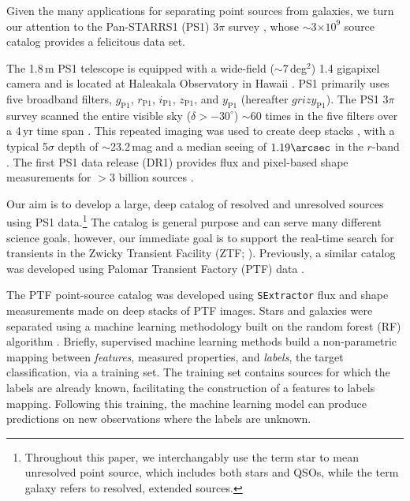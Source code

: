 \documentclass[twocolumn, dvipdfmx]{aastex62}
\begin{document}
\begin{CJK*}{UTF8}{gbsn}
Given the many applications for separating point sources from
galaxies, we turn our attention to the Pan-STARRS1 (PS1) 3$\pi$ survey
\citep{Chambers16}, whose $\sim$3$\times 10^{9}$ source catalog provides a
felicitous data set.

The 1.8\,m PS1 telescope is equipped with a wide-field ($\sim$7\,deg$^2$)
1.4 gigapixel camera and is located at Haleakala Observatory in Hawaii
\citep{Hodapp04}. PS1 primarily uses five broadband filters,
$g_{\mathrm{P1}}$, $r_{\mathrm{P1}}$, $i_{\mathrm{P1}}$, $z_{\mathrm{P1}}$,
and $y_{\mathrm{P1}}$ (hereafter $grizy_{\mathrm{P1}}$). The PS1 3$\pi$
survey scanned the entire visible sky ($\delta > -30^\circ$) $\sim$60 times
in the five filters over a 4\,yr time span \citep{Chambers16}. This
repeated imaging was used to create deep stacks \citep{Magnier16a}, with a
typical 5$\sigma$ depth of $\sim$23.2\,mag and a median seeing of
$1.19\arcsec$ in the $r$-band \citep{Tonry12, Schlafly12, Chambers16}. The
first PS1 data release (DR1) provides flux and pixel-based shape
measurements for $>$3 billion sources \citep{Flewelling16}.

Our aim is to develop a large, deep catalog of resolved and unresolved
sources using PS1 data.\footnote{Throughout this paper, we interchangably
use the term star to mean unresolved point source, which includes both stars
and QSOs, while the term galaxy refers to resolved, extended sources.} The
catalog is general purpose and can serve many different science goals,
however, our immediate goal is to support the real-time search for
transients in the Zwicky Transient Facility (ZTF; \citealt{Bellm:18:ZTF}).
Previously, a similar catalog was developed using Palomar Transient Factory
(PTF) data \citep{Miller17}.

The PTF point-source catalog was developed using \texttt{SExtractor}
\citep{bertin96} flux and shape measurements made on deep stacks of PTF
images. Stars and galaxies were separated using a machine learning
methodology built on the random forest (RF) algorithm \citep{Breiman01}.
Briefly, supervised machine learning methods build a non-parametric mapping
between \textit{features}, measured properties, and \textit{labels}, the
target classification, via a training set. The training set contains sources
for which the labels are already known, facilitating the construction of a
features to labels mapping. Following this training, the machine learning
model can produce predictions on new observations where the labels are
unknown.


\end{CJK*}
\end{document}
